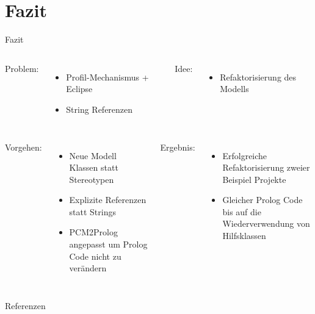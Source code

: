 \documentclass{sdqbeamer}
\begin{document}
\section{Fazit}
\begin{frame}{Fazit}
	\begin{columns}[t]
		Problem:
		\begin{itemize}
			\item Profil-Mechanismus + Eclipse
			\item String Referenzen
		\end{itemize}
		Idee:
			\begin{itemize}
			\item Refaktorisierung des Modells
		\end{itemize}

	\end{columns}
	\vspace{0.05\textheight}
	\begin{columns}[t]
		Vorgehen:
		\begin{itemize}
		\item Neue Modell Klassen statt Stereotypen
		\item Explizite Referenzen statt Strings
		\item PCM2Prolog angepasst um Prolog Code nicht zu verändern
		\end{itemize}
	Ergebnis:
		\begin{itemize}
		\item Erfolgreiche Refaktorisierung zweier Beispiel Projekte
		\item Gleicher Prolog Code bis auf die Wiederverwendung von Hilfsklassen
\end{itemize}
\end{columns}
	
\end{frame}

\begin{frame}{Referenzen}
	\nocite{*}
	\printbibliography
\end{frame}
\appendix
\beginbackup

\backupend
\end{document}
